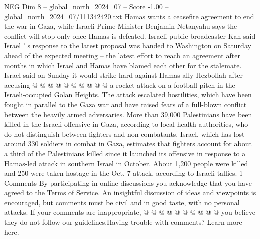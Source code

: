 \begin{textsample}{NEG Dim 8 – global\_north\_2024\_07 – Score -1.00 – global\_north\_2024\_07/111342420.txt}
Hamas wants a ceasefire agreement to end the war in Gaza, while Israeli Prime Minister Benjamin Netanyahu says the conflict will stop only once Hamas is defeated.
Israeli public broadcaster Kan said Israel ' s response to the latest proposal was handed to Washington on Saturday ahead of the expected meeting -- the latest effort to reach an agreement after months in which Israel and Hamas have blamed each other for the stalemate.
Israel said on Sunday it would strike hard against Hamas ally Hezbollah after accusing @ @ @ @ @ @ @ @ @ @ a rocket attack on a football pitch in the Israeli-occupied Golan Heights.
The attack escalated hostilities, which have been fought in parallel to the Gaza war and have raised fears of a full-blown conflict between the heavily armed adversaries.
More than 39,000 Palestinians have been killed in the Israeli offensive in Gaza, according to local health authorities, who do not distinguish between fighters and non-combatants.
Israel, which has lost around 330 soldiers in combat in Gaza, estimates that fighters account for about a third of the Palestinians killed since it launched its offensive in response to a Hamas-led attack in southern Israel in October.
About 1,200 people were killed and 250 were taken hostage in the Oct. 7 attack, according to Israeli tallies. 1 Comments By participating in online discussions you acknowledge that you have agreed to the Terms of Service.
An insightful discussion of ideas and viewpoints is encouraged, but comments must be civil and in good taste, with no personal attacks.
If your comments are inappropriate, @ @ @ @ @ @ @ @ @ @ you believe they do not follow our guidelines.Having trouble with comments?
Learn more here.

\end{textsample}
